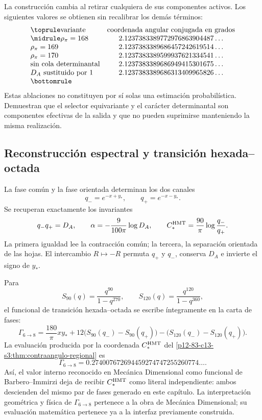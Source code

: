 La construcción cambia al retirar cualquiera de sus componentes activos.
Los siguientes valores se obtienen sin recalibrar los demás términos:
\[
\begin{array}{@{}lc@{}}
\toprule
\text{variante}&\text{coordenada angular conjugada en grados}\\
\midrule
\rho_\pi=168&2.1237383389772976863904487\ldots\\
\rho_\pi=169&2.1237383389686457242619514\ldots\\
\rho_\pi=170&2.1237383389599937621334541\ldots\\
\text{sin cola determinantal}&2.1237383389686949415301675\ldots\\
D_A\text{ sustituido por }1&2.1237383389686313409965826\ldots\\
\bottomrule
\end{array}
\]
Estas ablaciones no constituyen por sí solas una estimación probabilística.
Demuestran que el selector equivariante y el carácter determinantal son
componentes efectivas de la salida y que no pueden suprimirse manteniendo la
misma realización.

\subsection{Reconstrucción espectral y transición hexada--octada}

La fase común y la fase orientada determinan los dos canales
\[
q_-=e^{-x+y_*},
\qquad
q_+=e^{-x-y_*}.
\]
Se recuperan exactamente los invariantes
\[
q_-q_+=D_A,
\qquad
\alpha=-\frac9{100\pi}\log D_A,
\qquad
C_*^{\rm HMT}=\frac{90}{\pi}\log\frac{q_-}{q_+}.
\]
La primera igualdad lee la contracción común; la tercera, la separación
orientada de las hojas. El intercambio \(R\mapsto-R\) permuta
\(q_+\) y \(q_-\), conserva \(D_A\) e invierte el signo de \(y_*\).

Para
\[
S_{90}(q)=\frac{q^{90}}{1-q^{270}},
\qquad
S_{120}(q)=\frac{q^{120}}{1-q^{360}},
\]
el funcional de transición hexada--octada se escribe íntegramente en la
carta de fases:
\[
\Gamma_{6\to8}
=\frac{180}{\pi}xy_*
+12\bigl(S_{90}(q_-)-S_{90}(q_+)\bigr)
-\bigl(S_{120}(q_-)-S_{120}(q_+)\bigr).
\]
La evaluación producida por la coordenada \(C_*^{\rm HMT}\) del
\cref{p12-83-c13-s3:thm:contraangulo-regional} es
\[
\boxed{
\Gamma_{6\to8}
=0.274007672694459274747255260774\ldots.}
\]
Así, el valor interno reconocido en Mecánica Dimensional como funcional de
Barbero--Immirzi deja de recibir \(C_*^{\rm HMT}\) como literal independiente:
ambos descienden del mismo par de fases generado en este capítulo. La
interpretación geométrica y física de \(\Gamma_{6\to8}\) pertenece a la obra
de Mecánica Dimensional; su evaluación matemática pertenece ya a la interfaz
previamente construida.

